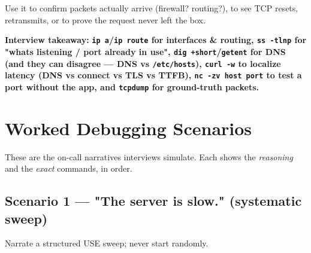 \documentclass[11pt]{article}
\begin{document}
Use it to confirm packets actually arrive (firewall? routing?), to see TCP resets, retransmits, or to prove the request never left the box.

\textbf{Interview takeaway:} \textbf{\texttt{ip\ a}/\texttt{ip\ route} for interfaces \& routing, \texttt{ss\ -tlnp} for "what\textquotesingle s listening / port already in use", \texttt{dig\ +short}/\texttt{getent} for DNS (and they can disagree --- DNS vs \texttt{/etc/hosts}), \texttt{curl\ -w} to localize latency (DNS vs connect vs TLS vs TTFB), \texttt{nc\ -zv\ host\ port} to test a port without the app, and \texttt{tcpdump} for ground-truth packets.}

\section{Worked Debugging Scenarios}\label{worked-debugging-scenarios}

These are the on-call narratives interviews simulate. Each shows the \emph{reasoning} and the \emph{exact} commands, in order.

\subsection{Scenario 1 --- "The server is slow." (systematic sweep)}\label{scenario-1--the-server-is-slow-systematic-sweep}

Narrate a structured USE sweep; never start randomly.

\end{document}
